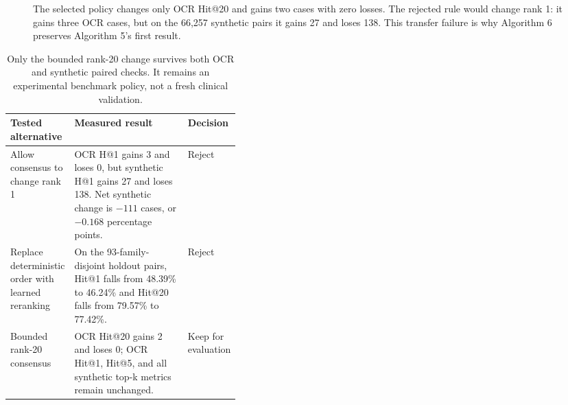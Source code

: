 \documentclass[11pt]{article}
\begin{document}
\begin{figure}[htbp]
\centering
{}
\caption{The selected policy changes only OCR Hit@20 and gains two cases with
zero losses. The rejected rule would change rank 1: it gains three OCR cases,
but on the 66,257 synthetic pairs it gains 27 and loses 138. This transfer
failure is why Algorithm 6 preserves Algorithm 5's first result.}
\label{fig:paired-policy}
\end{figure}

\begin{table}[htbp]
\centering
\small
\begin{tabularx}{\linewidth}{@{}L{0.24\linewidth}Y L{0.15\linewidth}@{}}
\toprule
\textbf{Tested alternative} & \textbf{Measured result} & \textbf{Decision} \\
\midrule
Allow consensus to change rank 1 & OCR H@1 gains 3 and loses 0, but synthetic H@1 gains 27 and loses 138. Net synthetic change is $-111$ cases, or $-0.168$ percentage points. & Reject \\
Replace deterministic order with learned reranking & On the 93-family-disjoint holdout pairs, Hit@1 falls from 48.39\% to 46.24\% and Hit@20 falls from 79.57\% to 77.42\%. & Reject \\
Bounded rank-20 consensus & OCR Hit@20 gains 2 and loses 0; OCR Hit@1, Hit@5, and all synthetic top-k metrics remain unchanged. & Keep for evaluation \\
\bottomrule
\end{tabularx}
\caption{Only the bounded rank-20 change survives both OCR and synthetic paired
checks. It remains an experimental benchmark policy, not a fresh clinical validation.}
\label{tab:alternatives}
\end{table}
\end{document}
